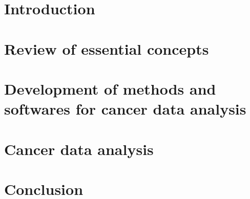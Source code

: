 \documentclass[doutorado, spanish, brazil, english,pos-defesa]{packages/icmc}
\begin{document}
\textual

\chapter{Introduction}
\label{chapter:introducao}


\chapter{Review of essential concepts}


\chapter{Development of methods and softwares for cancer data analysis}
\label{chapter:softwares}


\chapter{Cancer data analysis}




\chapter{Conclusion}





%

\postextual




%
\glsaddall
\printglossaries
\end{document}
